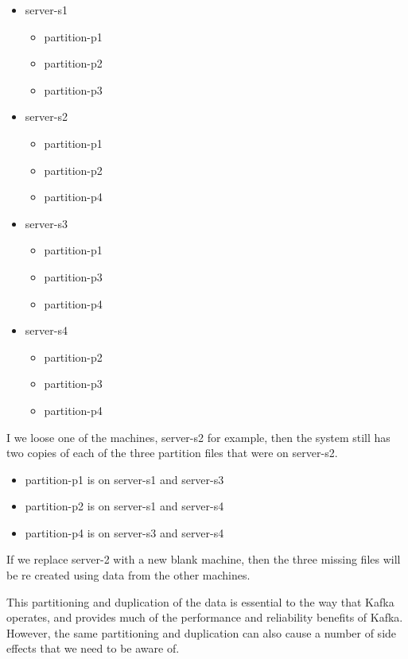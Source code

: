 \documentclass{article}
\begin{document}
\begin{itemize}
    \item server-s1
    \begin{itemize}
        \item partition-p1
        \item partition-p2
        \item partition-p3
    \end{itemize}
    \item server-s2
    \begin{itemize}
        \item partition-p1
        \item partition-p2
        \item partition-p4
    \end{itemize}
    \item server-s3
    \begin{itemize}
        \item partition-p1
        \item partition-p3
        \item partition-p4
    \end{itemize}
    \item server-s4
    \begin{itemize}
        \item partition-p2
        \item partition-p3
        \item partition-p4
    \end{itemize}
\end{itemize}

I we loose one of the machines, server-s2 for example, then the system still has two copies of each of the three partition files that were on server-s2.

\begin{itemize}
    \item partition-p1 is on server-s1 and server-s3
    \item partition-p2 is on server-s1 and server-s4
    \item partition-p4 is on server-s3 and server-s4
\end{itemize}

If we replace server-2 with a new blank machine, then the three missing files will be re created using data from the other machines.

This partitioning and duplication of the data is essential to the way that Kafka operates,
and provides much of the performance and reliability benefits of Kafka.
However, the same partitioning and duplication can also cause a number of
side effects that we need to be aware of.
\end{document}

